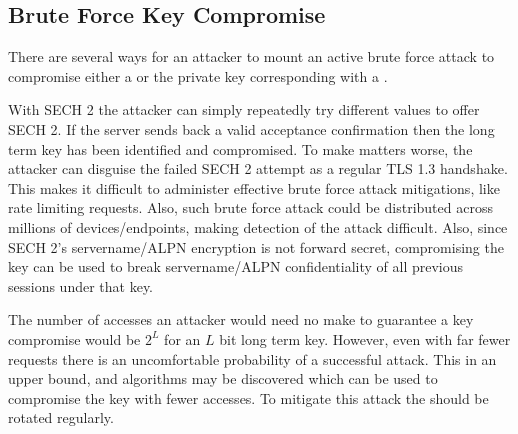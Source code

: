 \subsection{Brute Force Key Compromise}

There are several ways for an attacker to mount an active brute force attack
to compromise either a \varsechlongtermkey{} or the private key
corresponding with a .

With \ac{SECH} 2 the attacker can simply repeatedly try different \varsechlongtermkey{}
values to offer \ac{SECH} 2.
If the server sends back a valid acceptance confirmation then the long term key
has been identified and compromised.
To make matters worse, the attacker can disguise the failed \ac{SECH} 2 attempt
as a regular \ac{TLS} 1.3 handshake.
This makes it difficult to administer effective brute force attack mitigations,
like rate limiting requests.
Also, such brute force attack could be distributed across millions of
devices/endpoints, making detection of the attack difficult.
Also, since \ac{SECH} 2's servername/\ac{ALPN} encryption is not forward secret,
compromising the key can be used to break servername/\ac{ALPN} confidentiality of all previous sessions
under that key.

The number of accesses an attacker would need no make to guarantee
a key compromise would be $2^L$ for an $L$ bit long term key.
However, even with far fewer requests there is an uncomfortable
probability of a successful attack.
This in an upper bound, and algorithms may be discovered
which can be used to compromise the key with fewer accesses.
To mitigate this attack the \varsechlongtermkey{} should be rotated regularly.
